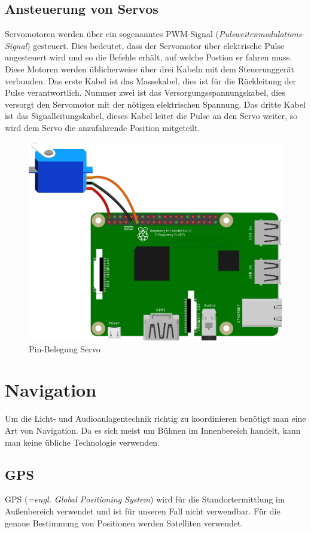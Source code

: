 \subsection{Ansteuerung von Servos}
Servomotoren werden über ein sogenanntes PWM-Signal (\emph{Pulsweitenmodulations-Signal}) gesteuert. Dies bedeutet, dass der Servomotor über elektrische Pulse angesteuert wird und so die Befehle erhält, auf welche Postion er fahren muss. Diese Motoren werden üblicherweise über drei Kabeln mit dem Steuerunggerät verbunden. Das erste Kabel ist das Massekabel, dies ist für die Rückleitung der Pulse verantwortlich. Nummer zwei ist das Versorgungsspannungskabel, dies versorgt den Servomotor mit der nötigen elektrischen Spannung. Das dritte Kabel ist das Signalleitungskabel, dieses Kabel leitet die Pulse an den Servo weiter, so wird dem Servo die anzufahrende Position mitgeteilt.\\
\textcite{ServomotorAnsteuerung}

\begin{figure}[H]
	\centering
	\includegraphics[width=0.7\linewidth]{images/Pin_Belegung.png}
	\caption[Pin-Belegung Servo]{Pin-Belegung Servo}
	\label{fig:PIN_Belegung}
\end{figure}

\section{Navigation}

Um die Licht- und Audioanlagentechnik richtig zu koordinieren benötigt man eine Art von Navigation. Da es sich meist um Bühnen im Innenbereich handelt, kann man keine übliche Technologie verwenden.


\subsection{GPS}
GPS (\emph{=engl. Global Positioning System}) \textcite{GPS} wird für die Standortermittlung im Außenbereich verwendet und ist für unseren Fall nicht verwendbar. Für die genaue Bestimmung von Positionen werden Satelliten verwendet.

